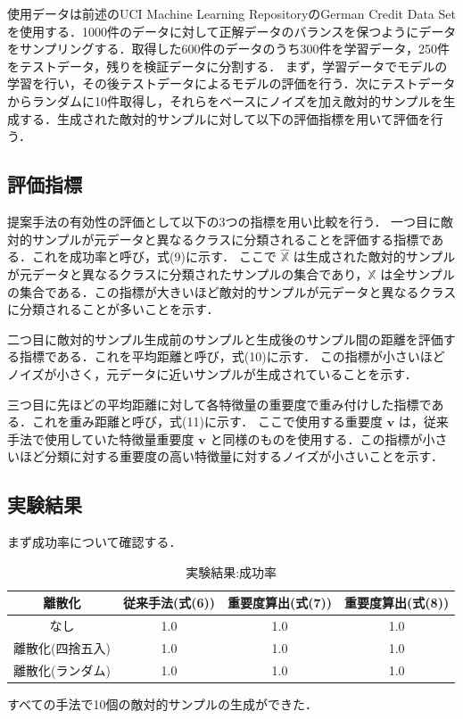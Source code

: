 使用データは前述のUCI Machine Learning RepositoryのGerman Credit Data Setを使用する．1000件のデータに対して正解データのバランスを保つようにデータをサンプリングする．取得した600件のデータのうち300件を学習データ，250件をテストデータ，残りを検証データに分割する．
まず，学習データでモデルの学習を行い，その後テストデータによるモデルの評価を行う．次にテストデータからランダムに10件取得し，それらをベースにノイズを加え敵対的サンプルを生成する．生成された敵対的サンプルに対して以下の評価指標を用いて評価を行う．

\subsection{評価指標}
提案手法の有効性の評価として以下の3つの指標を用い比較を行う．
一つ目に敵対的サンプルが元データと異なるクラスに分類されることを評価する指標である．これを成功率と呼び，式(9)に示す．
ここで $\hat{\mathbb{X}}$ は生成された敵対的サンプルが元データと異なるクラスに分類されたサンプルの集合であり，$\mathbb{X}$ は全サンプルの集合である．この指標が大きいほど敵対的サンプルが元データと異なるクラスに分類されることが多いことを示す．

二つ目に敵対的サンプル生成前のサンプルと生成後のサンプル間の距離を評価する指標である．これを平均距離と呼び，式(10)に示す．
この指標が小さいほどノイズが小さく，元データに近いサンプルが生成されていることを示す．

三つ目に先ほどの平均距離に対して各特徴量の重要度で重み付けした指標である．これを重み距離と呼び，式(11)に示す．
ここで使用する重要度 $\bm{v}$ は，従来手法で使用していた特徴量重要度 $\bm{v}$ と同様のものを使用する．この指標が小さいほど分類に対する重要度の高い特徴量に対するノイズが小さいことを示す．

\subsection{実験結果}
まず成功率について確認する．
\begin{table}[H]
    \centering
    \caption{実験結果:成功率}
    \begin{tabular}{|c|c|c|c|} \hline
        離散化 & 従来手法(式(6)) & 重要度算出(式(7)) & 重要度算出(式(8)) \\ \hline
        なし & 1.0 & 1.0 & 1.0 \\ \hline
        離散化(四捨五入) & 1.0 & 1.0 & 1.0 \\ \hline
        離散化(ランダム) & 1.0 & 1.0 & 1.0 \\ \hline
    \end{tabular}
\end{table}
すべての手法で10個の敵対的サンプルの生成ができた．


